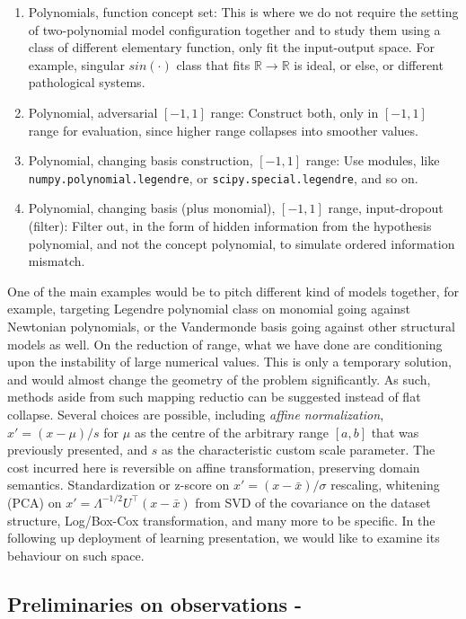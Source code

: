 \begin{enumerate}[topsep=1pt,itemsep=1pt]
    \item Polynomials, function concept set: This is where we do not require the setting of two-polynomial model configuration together and to study them using a class of different elementary function, only fit the input-output space. For example, singular $sin(\cdot)$ class that fits $\mathbb{R}\to\mathbb{R}$ is ideal, or else, or different pathological systems. 
    \item Polynomial, adversarial $[-1,1]$ range: Construct both, only in $[-1,1]$ range for evaluation, since higher range collapses into smoother values. 
    \item Polynomial, changing basis construction, $[-1,1]$ range: Use modules, like \texttt{numpy.polynomial.legendre}, or \texttt{scipy.special.legendre}, and so on. 
    \item Polynomial, changing basis (plus monomial), $[-1,1]$ range, input-dropout (filter): Filter out, in the form of hidden information from the hypothesis polynomial, and not the concept polynomial, to simulate ordered information mismatch. 
\end{enumerate}
One of the main examples would be to pitch different kind of models together, for example, targeting Legendre polynomial class on monomial going against Newtonian polynomials, or the Vandermonde basis going against other structural models as well. On the reduction of range, what we have done are conditioning upon the instability of large numerical values. This is only a temporary solution, and would almost change the geometry of the problem significantly. As such, methods aside from such mapping reductio can be suggested instead of flat collapse. Several choices are possible, including \textit{affine normalization}, $x'=(x-\mu)/s$ for $\mu$ as the centre of the arbitrary range $[a,b]$ that was previously presented, and $s$ as the characteristic custom scale parameter. The cost incurred here is reversible on affine transformation, preserving domain semantics. Standardization or z-score on $x'=(x-\bar{x})/\sigma$ rescaling, whitening (PCA) on $x'=\Lambda^{-1/2}U^{\top}(x-\bar{x})$ from SVD of the covariance on the dataset structure, Log/Box-Cox transformation, and many more to be specific. In the following up deployment of learning presentation, we would like to examine its behaviour on such space. 

\subsection{Preliminaries on observations - \cite{schaeffer_double_2023}}

